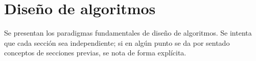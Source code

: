 
\part{Diseño de algoritmos}

Se presentan los paradigmas fundamentales de diseño de algoritmos. Se intenta que cada sección sea independiente; si en algún punto se da por sentado conceptos de secciones previas, se nota de forma explícita.

